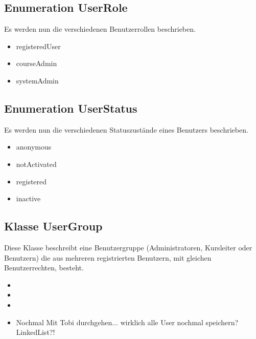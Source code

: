 	\subsection{Enumeration UserRole}
	Es werden nun die verschiedenen Benutzerrollen beschrieben.
	\begin{itemize}
		\item {registeredUser}
		\item {courseAdmin}
		\item {systemAdmin}
	\end{itemize}
	
	\subsection{Enumeration UserStatus}
	Es werden nun die verschiedenen Statuszustände eines Benutzers beschrieben.
	\begin{itemize}
		\item {anonymous}
		\item {notActivated}
		\item {registered}
		\item {inactive}
	\end{itemize}
	
	\subsection{Klasse UserGroup}
	Diese Klasse beschreibt eine Benutzergruppe (Administratoren, Kursleiter oder Benutzern) die aus mehreren registrierten Benutzern, mit gleichen Benutzerrechten, besteht.
	\begin{itemize}
		\item {}
		\item {}
		\item {}
		\item {}
		Nochmal Mit Tobi durchgehen... wirklich alle User nochmal speichern? LinkedList?!
		
	\end{itemize}
	
